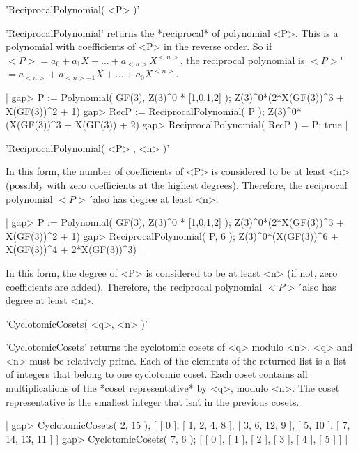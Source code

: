 
'ReciprocalPolynomial( <P> )'

'ReciprocalPolynomial' returns the  *reciprocal* of  polynomial <P>. This
is a polynomial   with coefficients of <P>   in the reverse  order. So if
$<P>=a_0 + a_1 X +  ... + a_{<n>}  X^{<n>}$, the reciprocal polynomial is
$<P>$\'$=a_{<n>} + a_{<n>-1} X + ... + a_0 X^{<n>}$.

|    gap> P := Polynomial( GF(3), Z(3)^0 * [1,0,1,2] );
    Z(3)^0*(2*X(GF(3))^3 + X(GF(3))^2 + 1)
    gap> RecP := ReciprocalPolynomial( P );
    Z(3)^0*(X(GF(3))^3 + X(GF(3)) + 2)
    gap> ReciprocalPolynomial( RecP ) = P;
    true |

'ReciprocalPolynomial( <P> , <n> )'

In  this form, the number  of coefficients of  <P> is considered to be at
least <n>    (possibly    with   zero  coefficients  at      the  highest
degrees). Therefore, the  reciprocal polynomial $<P>$\'\ also has  degree
at least <n>.

|    gap> P := Polynomial( GF(3), Z(3)^0 * [1,0,1,2] );
    Z(3)^0*(2*X(GF(3))^3 + X(GF(3))^2 + 1)
    gap> ReciprocalPolynomial( P, 6 );
    Z(3)^0*(X(GF(3))^6 + X(GF(3))^4 + 2*X(GF(3))^3) |

In this form, the degree of <P> is considered to be at least <n> (if not,
zero  coefficients  are  added). Therefore,   the  reciprocal  polynomial
$<P>$\'\ also has degree at least <n>.


'CyclotomicCosets( <q>, <n> )'

'CyclotomicCosets'  returns the cyclotomic cosets  of <q> modulo <n>. <q>
and <n> must  be relatively prime. Each  of the elements  of the returned
list is  a list of  integers that  belong to  one cyclotomic  coset. Each
coset contains all multiplications of the  *coset representative* by <q>,
modulo <n>. The coset representative  is the smallest integer that isn\'t
in the previous cosets.

|    gap> CyclotomicCosets( 2, 15 );
    [ [ 0 ], [ 1, 2, 4, 8 ], [ 3, 6, 12, 9 ], [ 5, 10 ],
      [ 7, 14, 13, 11 ] ]
    gap> CyclotomicCosets( 7, 6 );
    [ [ 0 ], [ 1 ], [ 2 ], [ 3 ], [ 4 ], [ 5 ] ] |


